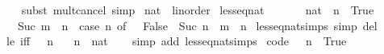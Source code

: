 \begin{isabellebody}
%
\isadelimproof
\ \ %
\endisadelimproof
%
\isatagproof
{}\isamarkupfalse%
\ {\isacharparenleft}{\kern0pt}subst\ mult{\isacharunderscore}{\kern0pt}cancel{}{\isacharparenright}{\kern0pt}\ simp%
\endisatagproof
{\isafoldproof}%
%
\isadelimproof
%
\endisadelimproof
%
\isadelimdocument
%
\endisadelimdocument
%
\isatagdocument
%
\isamarkuptrue%
%
\isamarkuptrue%
%
\endisatagdocument
{\isafolddocument}%
%
\isadelimdocument
%
\endisadelimdocument
{}\isamarkupfalse%
\ nat\ {\isacharcolon}{\kern0pt}{\isacharcolon}{\kern0pt}\ linorder\isanewline
{}\isanewline
\isanewline
{}\isamarkupfalse%
\ less{\isacharunderscore}{\kern0pt}eq{\isacharunderscore}{\kern0pt}nat\isanewline
\ \ \isanewline
\ \ \ \ {\isachardoublequoteopen}{\isacharparenleft}{\kern0pt}{}{\isacharcolon}{\kern0pt}{\isacharcolon}{\kern0pt}nat{\isacharparenright}{\kern0pt}\ {\isasymle}\ n\ {\isasymlongleftrightarrow}\ True{\isachardoublequoteclose}\isanewline
\ \ {\isacharbar}{\kern0pt}\ {\isachardoublequoteopen}Suc\ m\ {\isasymle}\ n\ {\isasymlongleftrightarrow}\ {\isacharparenleft}{\kern0pt}case\ n\ of\ {}\ {\isasymRightarrow}\ False\ {\isacharbar}{\kern0pt}\ Suc\ n\ {\isasymRightarrow}\ m\ {\isasymle}\ n{\isacharparenright}{\kern0pt}{\isachardoublequoteclose}\isanewline
\isanewline
{}\isamarkupfalse%
\ less{\isacharunderscore}{\kern0pt}eq{\isacharunderscore}{\kern0pt}nat{\isachardot}{\kern0pt}simps\ {\isacharbrackleft}{\kern0pt}simp\ del{\isacharbrackright}{\kern0pt}\isanewline
\isanewline
{}\isamarkupfalse%
\ le{}\ {\isacharbrackleft}{\kern0pt}iff{\isacharbrackright}{\kern0pt}{\isacharcolon}{\kern0pt}\ {\isachardoublequoteopen}{}\ {\isasymle}\ n{\isachardoublequoteclose}\ \isanewline
\ \ n\ {\isacharcolon}{\kern0pt}{\isacharcolon}{\kern0pt}\ nat\isanewline
%
\isadelimproof
\ \ %
\endisadelimproof
%
\isatagproof
{}\isamarkupfalse%
\ {\isacharparenleft}{\kern0pt}simp\ add{\isacharcolon}{\kern0pt}\ less{\isacharunderscore}{\kern0pt}eq{\isacharunderscore}{\kern0pt}nat{\isachardot}{\kern0pt}simps{\isacharparenright}{\kern0pt}%
\endisatagproof
{\isafoldproof}%
%
\isadelimproof
\isanewline
%
\endisadelimproof
\isanewline
{}\isamarkupfalse%
\ {\isacharbrackleft}{\kern0pt}code{\isacharbrackright}{\kern0pt}{\isacharcolon}{\kern0pt}\ {\isachardoublequoteopen}{}\ {\isasymle}\ n\ {\isasymlongleftrightarrow}\ True{\isachardoublequoteclose}\isanewline

\end{isabellebody}
